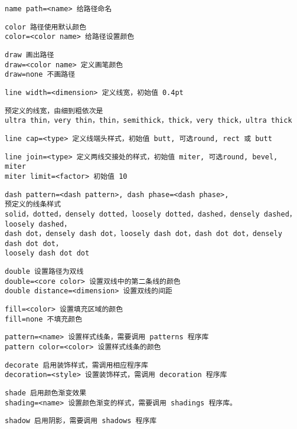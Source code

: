 \documentclass[UTF8]{ctexart}
\begin{document}
\begin{lstlisting}
name path=<name> 给路径命名
\end{lstlisting}
\begin{lstlisting}
color 路径使用默认颜色
color=<color name> 给路径设置颜色
\end{lstlisting}
\begin{lstlisting}
draw 画出路径
draw=<color name> 定义画笔颜色
draw=none 不画路径
\end{lstlisting}
\begin{lstlisting}
line width=<dimension> 定义线宽，初始值 0.4pt
\end{lstlisting}
\begin{lstlisting}
预定义的线宽，由细到粗依次是 
ultra thin，very thin，thin，semithick，thick，very thick，ultra thick
\end{lstlisting}
\begin{lstlisting}
line cap=<type> 定义线端头样式，初始值 butt, 可选round, rect 或 butt
\end{lstlisting}
\begin{lstlisting}
line join=<type> 定义两线交接处的样式，初始值 miter, 可选round, bevel, miter
miter limit=<factor> 初始值 10
\end{lstlisting}
\begin{lstlisting}
dash pattern=<dash pattern>, dash phase=<dash phase>,
预定义的线条样式
solid，dotted，densely dotted，loosely dotted，dashed，densely dashed，loosely dashed，
dash dot，densely dash dot，loosely dash dot，dash dot dot，densely dash dot dot，
loosely dash dot dot
\end{lstlisting}
\begin{lstlisting}
double 设置路径为双线
double=<core color> 设置双线中的第二条线的颜色
double distance=<dimension> 设置双线的间距
\end{lstlisting}
\begin{lstlisting}
fill=<color> 设置填充区域的颜色
fill=none 不填充颜色
\end{lstlisting}
\begin{lstlisting}
pattern=<name> 设置样式线条，需要调用 patterns 程序库
pattern color=<color> 设置样式线条的颜色
\end{lstlisting}
\begin{lstlisting}
decorate 启用装饰样式，需调用相应程序库
decoration=<style> 设置装饰样式，需调用 decoration 程序库
\end{lstlisting}
\begin{lstlisting}
shade 启用颜色渐变效果
shading=<name> 设置颜色渐变的样式，需要调用 shadings 程序库。
\end{lstlisting}
\begin{lstlisting}
shadow 启用阴影，需要调用 shadows 程序库
\end{lstlisting}
\end{document}
